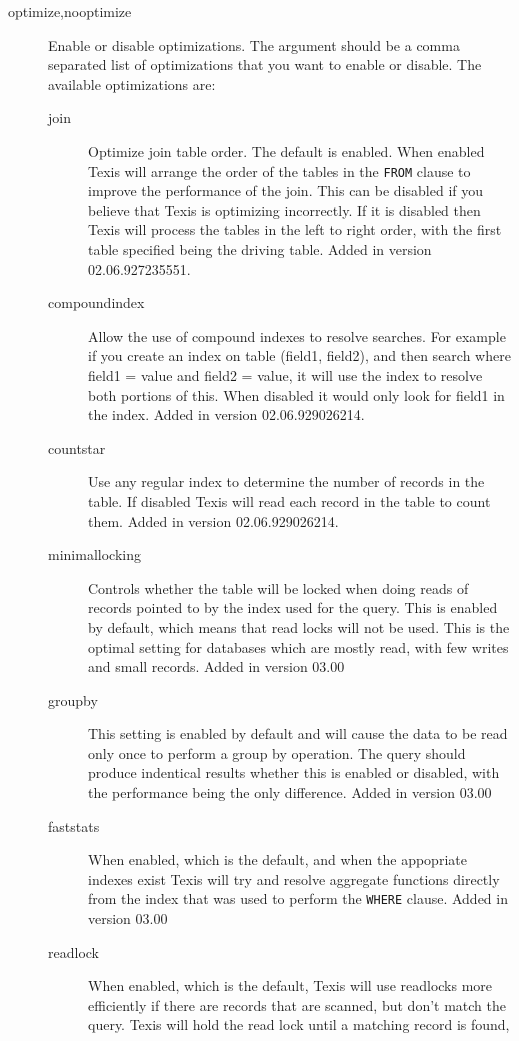 \begin{description}
\item[optimize,nooptimize] Enable or disable optimizations.  The argument
should be a comma separated list of optimizations that you want to enable
or disable.  The available optimizations are:
\begin{description}
\item[join]  Optimize join table order.  The default is enabled.
When enabled Texis will arrange the order of the tables in the \verb`FROM`
clause to improve the performance of the join.  This can be disabled if
you believe that Texis is optimizing incorrectly.  If it is disabled then
Texis will process the tables in the left to right order, with the first
table specified being the driving table.  Added in version 02.06.927235551.
\item[compoundindex]  Allow the use of compound indexes to resolve searches.
For example if you create an index on table (field1, field2), and then
search where field1 = value and field2 = value, it will use the index to
resolve both portions of this.  When disabled it would only look for field1
in the index.
Added in version 02.06.929026214.
\item[countstar]  Use any regular index to determine the number of records
in the table.  If disabled Texis will read each record in the table to
count them.
Added in version 02.06.929026214.
\item[minimallocking]  Controls whether the table will be locked when doing
reads of records pointed to by the index used for the query.  This is enabled
by default, which means that read locks will not be used.  This is the optimal
setting for databases which are mostly read, with few writes and small records.
Added in version 03.00
\item[groupby]  This setting is enabled by default and will cause the data
to be read only once to perform a group by operation.  The query should
produce indentical results whether this is enabled or disabled, with the
performance being the only difference.
Added in version 03.00
\item[faststats]  When enabled, which is the default, and when the
appopriate indexes exist Texis will try and resolve aggregate functions
directly from the index that was used to perform the \verb`WHERE` clause.    
Added in version 03.00
\item[readlock]  When enabled, which is the default, Texis will use readlocks
more efficiently if there are records that are scanned, but don't match the
query.  Texis will hold the read lock until a matching record is found,

\end{description}
\end{description}
